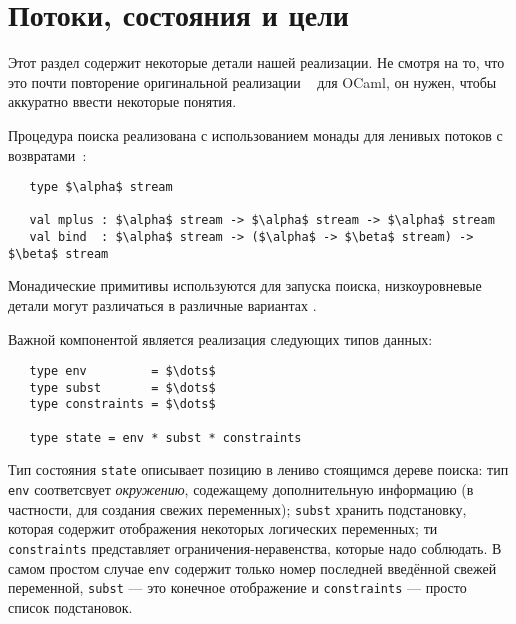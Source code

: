 
\section{Потоки, состояния и цели}
\label{sec:goals}

Этот раздел содержит некоторые детали нашей реализации.
Не смотря на то, что это почти повторение оригинальной реализации ~\cite{MicroKanren, CKanren} для OCaml, он нужен, чтобы аккуратно ввести некоторые понятия.

Процедура поиска реализована с использованием монады для ленивых потоков с возвратами~\cite{KiselyovBacktracking}:

\begin{lstlisting}
   type $\alpha$ stream

   val mplus : $\alpha$ stream -> $\alpha$ stream -> $\alpha$ stream
   val bind  : $\alpha$ stream -> ($\alpha$ -> $\beta$ stream) -> $\beta$ stream
\end{lstlisting}

\noindent Монадические примитивы используются для запуска поиска, низкоуровневые детали могут различаться в  различные вариантах \miniKanren.

Важной компонентой является реализация следующих типов данных:

\begin{lstlisting}
   type env         = $\dots$
   type subst       = $\dots$
   type constraints = $\dots$

   type state = env * subst * constraints
\end{lstlisting}
Тип состояния \lstinline|state| описывает позицию в лениво стоящимся дереве поиска:
тип \lstinline|env| соответсвует  \emph{окружению}, содежащему дополнительную информацию (в частности, для создания свежих переменных);
\lstinline|subst| хранить подстановку, которая содержит отображения некоторых логических переменных;
ти \lstinline|constraints| представляет ограничения-неравенства, которые надо соблюдать.
В самом простом случае \lstinline|env| содержит только номер последней введённой свежей переменной, \lstinline|subst| --- это конечное отображение и \lstinline|constraints| --- просто список подстановок.

